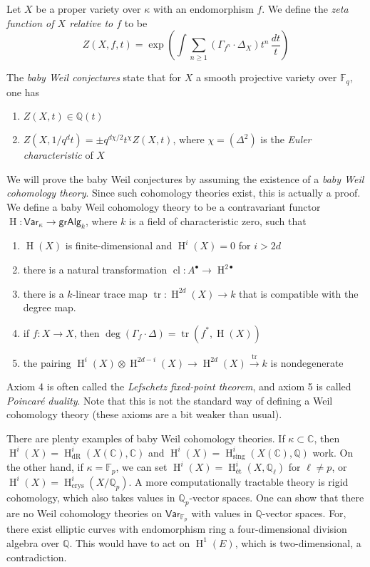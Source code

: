 \documentclass{article}
\DeclareMathOperator{\h}{H}
\DeclareMathOperator{\tr}{tr}
\newcommand{\vark}{\mathsf{Var}_\kappa}
\begin{document}
Let $X$ be a proper variety over $\kappa$ with an endomorphism $f$. We define 
the \emph{zeta function of $X$ relative to $f$} to be 
\[
  Z(X,f,t) = \exp\left(\int \sum_{n\geqslant 1} \left(\Gamma_{f^n}\cdot\Delta_X\right) t^n \, \frac{dt}{t}\right)
\]

The \emph{baby Weil conjectures} state that for $X$ a smooth projective 
variety over $\mathbb{F}_q$, one has 
\begin{enumerate}
  \item $Z(X,t) \in \mathbb{Q}(t)$
  \item $Z(X,1/q^d t) = \pm q^{d \chi/2} t^\chi Z(X,t)$, where 
    $\chi=(\Delta^2)$ is the \emph{Euler characteristic} of $X$
\end{enumerate}
We will prove the baby Weil conjectures by assuming the existence of a 
\emph{baby Weil cohomology theory}. Since such cohomology theories exist, 
this is actually a proof. We define a baby Weil cohomology theory to be a 
contravariant functor $\h:\vark\to \mathsf{grAlg}_k$, where $k$ is a field 
of characteristic zero, such that 
\begin{enumerate}
  \item $\h(X)$ is finite-dimensional and $\h^i(X)=0$ for $i>2 d$
  \item there is a natural transformation 
    $\operatorname{cl} :A^\bullet\to \h^{2\bullet}$
  \item there is a $k$-linear trace map $\tr:\h^{2 d}(X)\to k$ that is compatible 
    with the degree map. 
  \item if $f:X\to X$, then $\deg(\Gamma_f\cdot \Delta)=\tr(f^*,\h(X))$
  \item the pairing $\h^i(X)\otimes \h^{2d-i}(X)\to \h^{2 d}(X)\xrightarrow{\tr} k$ 
    is nondegenerate
\end{enumerate}
Axiom 4 is often called the \emph{Lefschetz fixed-point theorem}, and axiom 5 
is called \emph{Poincar\'e duality}. Note that this is not the standard way of 
defining a Weil cohomology theory (these axioms are a bit weaker than usual). 

There are plenty examples of baby Weil cohomology theories. If 
$\kappa\subset \mathbb C$, then $\h^i(X) = \h_\text{dR}^i(X(\mathbb C),\mathbb C)$ 
and $\h^i(X)=\h_\text{sing}^i(X(\mathbb C),\mathbb Q)$ work. On the other hand, 
if $\kappa=\mathbb F_p$, we can set $\h^i(X)=\h_\text{\'et}^i(X,\mathbb Q_\ell)$ 
for $\ell\ne p$, or $\h^i(X)=\h_\text{crys}^i(X/\mathbb Q_p)$. A more computationally 
tractable theory is rigid cohomology, which also takes values in $\mathbb Q_p$-vector 
spaces. One can show that there are no Weil cohomology theories on 
$\mathsf{Var}_{\mathbb F_p}$ with values in $\mathbb Q$-vector spaces. For, there exist 
elliptic curves with endomorphism ring a four-dimensional division algebra over 
$\mathbb Q$. This would have to act on $\h^1(E)$, which is two-dimensional, a 
contradiction. 
\end{document}
